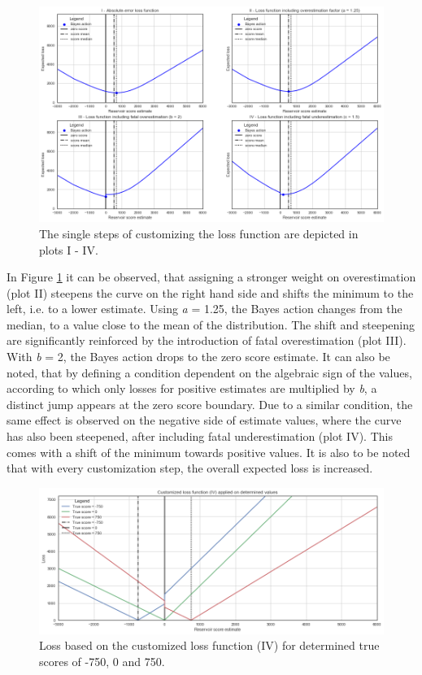 	\begin{figure}[h]
		\centering
		\includegraphics[width=1\textwidth]{Figures/LF_4steps.png}
		\caption{The single steps of customizing the loss function are depicted in plots I - IV.}\label{fig:LF_4steps}
	\end{figure}
	
	In Figure \ref{fig:LF_4steps} it can be observed, that assigning a stronger weight on overestimation (plot II) steepens the curve on the right hand side and shifts the minimum to the left, i.e. to a lower estimate. Using \textit{a} = 1.25, the Bayes action changes from the median, to a value close to the mean of the distribution. The shift and steepening are significantly reinforced by the introduction of fatal overestimation (plot III). With \textit{b} = 2, the Bayes action drops to the zero score estimate. It can also be noted, that by defining a condition dependent on the algebraic sign of the values, according to which only losses for positive estimates are multiplied by \textit{b}, a distinct jump appears at the zero score boundary. Due to a similar condition, the same effect is observed on the negative side of estimate values, where the curve has also been steepened, after including fatal underestimation (plot IV). This comes with a shift of the minimum towards positive values. It is also to be noted that with every customization step, the overall expected loss is increased.
	
	\begin{figure}[h]
		\centering
		\includegraphics[width=1\textwidth]{Figures/LF4_det_values.png}
		\caption{Loss based on the customized loss function (IV) for determined true scores of -750, 0 and 750.}\label{fig:LF4_det_values}
	\end{figure}
	
